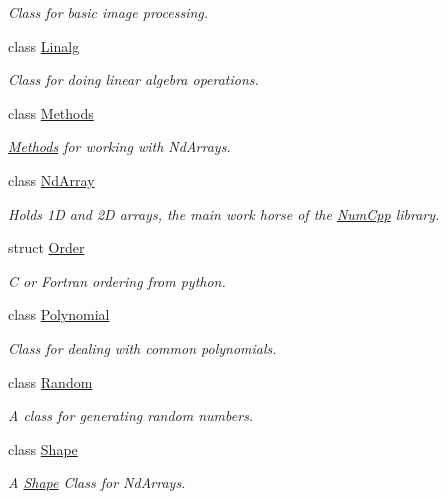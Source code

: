 \begin{DoxyCompactItemize}
\begin{DoxyCompactList}\small\item\em Class for basic image processing. \end{DoxyCompactList}\item 
class \mbox{\hyperlink{class_num_cpp_1_1_linalg}{Linalg}}
\begin{DoxyCompactList}\small\item\em Class for doing linear algebra operations. \end{DoxyCompactList}\item 
class \mbox{\hyperlink{class_num_cpp_1_1_methods}{Methods}}
\begin{DoxyCompactList}\small\item\em \mbox{\hyperlink{class_num_cpp_1_1_methods}{Methods}} for working with Nd\+Arrays. \end{DoxyCompactList}\item 
class \mbox{\hyperlink{class_num_cpp_1_1_nd_array}{Nd\+Array}}
\begin{DoxyCompactList}\small\item\em Holds 1D and 2D arrays, the main work horse of the \mbox{\hyperlink{namespace_num_cpp}{Num\+Cpp}} library. \end{DoxyCompactList}\item 
struct \mbox{\hyperlink{struct_num_cpp_1_1_order}{Order}}
\begin{DoxyCompactList}\small\item\em C or Fortran ordering from python. \end{DoxyCompactList}\item 
class \mbox{\hyperlink{class_num_cpp_1_1_polynomial}{Polynomial}}
\begin{DoxyCompactList}\small\item\em Class for dealing with common polynomials. \end{DoxyCompactList}\item 
class \mbox{\hyperlink{class_num_cpp_1_1_random}{Random}}
\begin{DoxyCompactList}\small\item\em A class for generating random numbers. \end{DoxyCompactList}\item 
class \mbox{\hyperlink{class_num_cpp_1_1_shape}{Shape}}
\begin{DoxyCompactList}\small\item\em A \mbox{\hyperlink{class_num_cpp_1_1_shape}{Shape}} Class for Nd\+Arrays. \end{DoxyCompactList}\item 

\end{DoxyCompactItemize}
